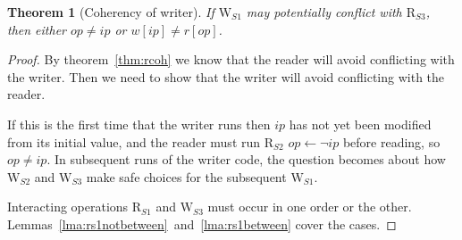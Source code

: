 \documentclass{article}
\newtheorem{thm}{Theorem}
\newtheorem{lemma}{Lemma}
\newcommand\RS[1]{\ensuremath{\text{R}_{S#1}}}
\newcommand\WS[1]{\ensuremath{\text{W}_{S#1}}}
\newcommand\W[1]{\ensuremath{w\left[#1\right]}}
\newcommand\R[1]{\ensuremath{r\left[#1\right]}}
\newcommand\ip{\ensuremath{ip}}
\newcommand\op{\ensuremath{op}}
\begin{document}

\begin{thm}[Coherency of writer]\label{thm:wcoh}
  If \WS1 may potentially conflict with \RS3, then either $\op\neq\ip$ or $\W{\ip}\neq\R{\op}$.
\end{thm}
\begin{proof}
  By theorem~\ref{thm:rcoh} we know that the reader will avoid conflicting with the writer.
  Then we need to show that the writer will avoid conflicting with the reader.

  If this is the first time that the writer runs then $\ip$ has not
  yet been modified from its initial value, and the reader must run
  \RS2 $\op\gets\neg\ip$ before reading, so $\op\neq\ip$. In
  subsequent runs of the writer code, the question becomes about how
  \WS2 and \WS3 make safe choices for the subsequent \WS1.

  Interacting operations \RS1 and \WS3 must occur in one order or the
  other. Lemmas~\ref{lma:rs1notbetween}~and~\ref{lma:rs1between} cover
  the cases.

\end{proof}
\end{document}
